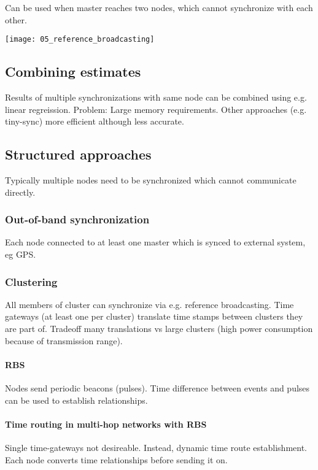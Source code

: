 Can be used when master reaches two nodes, which cannot synchronize with each other.

\texttt{[image: 05\_reference\_broadcasting]}

\subsection{Combining estimates}

Results of multiple synchronizations with same node can be combined using e.g.
linear regreission. Problem: Large memory requirements. Other approaches (e.g.
tiny-sync) more efficient although less accurate.

\subsection{Structured approaches}

Typically multiple nodes need to be synchronized which cannot communicate directly.

\subsubsection{Out-of-band synchronization}

Each node connected to at least one master which is synced to external system, eg GPS.

\subsubsection{Clustering}

All members of cluster can synchronize via e.g. reference broadcasting. Time
gateways (at least one per cluster) translate time stamps between clusters they
are part of. Tradeoff many translations vs large clusters (high power
consumption because of transmission range).

\paragraph{RBS}

Nodes send periodic beacons (pulses). Time difference between events and pulses
can be used to establish relationships.

\paragraph{Time routing in multi-hop networks with RBS}
Single time-gateways not desireable. Instead, dynamic time route establishment.
Each node converts time relationships before sending it on.

